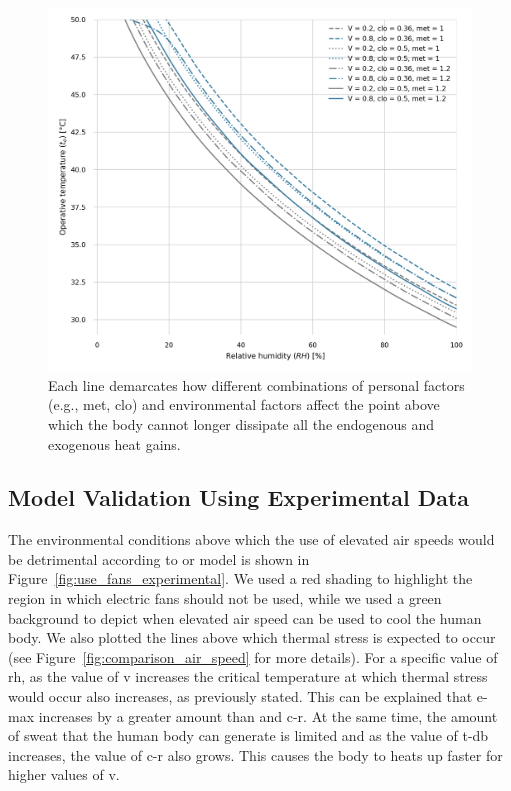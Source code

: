 \begin{figure}[thb!]
    \centering
    \includegraphics[width=\textwidth]{figures/met_clo}
    \caption{Each line demarcates how different combinations of personal factors (e.g., \ac{met}, \ac{clo}) and environmental factors affect the point above which the body cannot longer dissipate all the endogenous and exogenous heat gains.}
    \label{fig:met_clo}
\end{figure}

\subsection{Model Validation Using Experimental Data}\label{subsec:model-validation-experimental-data}

The environmental conditions above which the use of elevated air speeds would be detrimental according to or model is shown in Figure~\ref{fig:use_fans_experimental}.
We used a red shading to highlight the region in which electric fans should not be used, while we used a green background to depict when elevated air speed can be used to cool the human body.
We also plotted the lines above which thermal stress is expected to occur (see Figure~\ref{fig:comparison_air_speed} for more details).
For a specific value of \ac{rh}, as the value of \ac{v} increases the critical temperature at which thermal stress would occur also increases, as previously stated.
This can be explained that \ac{e-max} increases by a greater amount than and \ac{c-r}.
At the same time, the amount of sweat that the human body can generate is limited and as the value of \ac{t-db} increases, the value of \ac{c-r} also grows.
This causes the body to heats up faster for higher values of \ac{v}.

